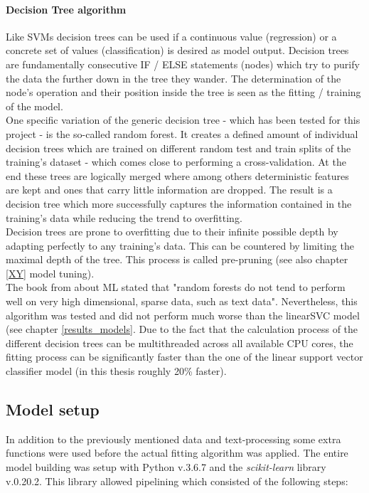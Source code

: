 \paragraph{Decision Tree algorithm}
Like SVMs decision trees can be used if a continuous value (regression) or a concrete set of values (classification) is desired as model output. Decision trees are fundamentally consecutive IF / ELSE statements (nodes) which try to purify the data the further down in the tree they wander. The determination of the node's operation and their position inside the tree is seen as the fitting / training of the model.\\
One specific variation of the generic decision tree - which has been tested for this project - is the so-called random forest. It creates a defined amount of individual decision trees which are trained on different random test and train splits of the training's dataset - which comes close to performing a cross-validation. At the end these trees are logically merged where among others deterministic features are kept and ones that carry little information are dropped. The result is a decision tree which more successfully captures the information contained in the training's data while reducing the trend to overfitting.\\
Decision trees are prone to overfitting due to their infinite possible depth by adapting perfectly to any training's data. This can be countered by limiting the maximal depth of the tree. This process is called pre-pruning (see also chapter \ref{XY} model tuning).\\
\newline
 The book from \parencite{Guido2016} about ML stated that "random forests do not tend to perform well on very high dimensional, sparse data, such as text data". Nevertheless, this algorithm was tested and did not perform much worse than the linearSVC model (see chapter \ref{results_models}. Due to the fact that the calculation process of the different decision trees can be multithreaded across all available CPU cores, the fitting process can be significantly faster than the one of the linear support vector classifier model (in this thesis roughly 20\% faster). 

\subsection{Model setup} \label{model_setup}
In addition to the previously mentioned data and text-processing some extra functions were used before the actual fitting algorithm was applied. The entire model building was setup with Python v.3.6.7 and the \textit{scikit-learn} library v.0.20.2. This library \parencite{2018Scikit-learnExtraction} allowed pipelining which consisted of the following steps:

